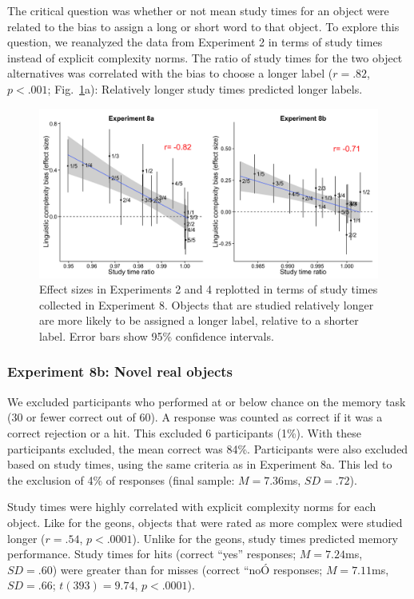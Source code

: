 \documentclass[man]{apa2}
\begin{document}
The critical question was whether or not mean study times for an object were related to the bias to assign a long or short word to that object. To explore this question, we reanalyzed the data from Experiment 2 in terms of study times instead of explicit complexity norms. The ratio of study times for the two object alternatives was correlated with the bias to choose a longer label ($r = .82$, $p < .001$; Fig.\ \ref{fig:study3_plots}a): Relatively longer study times predicted longer labels. 

 \begin{figure} 
 \begin{center} 
  \includegraphics[width=6in]{figures/study3_plots.png} 
  \caption{\label{fig:study3_plots} Effect sizes in Experiments 2 and 4 replotted in terms of study times collected in Experiment 8. Objects that are studied relatively longer are more likely to be assigned a longer label, relative to a shorter label. Error bars show 95\% confidence intervals.} 
 \end{center} 
\end{figure}	

\subsubsection{Experiment 8b: Novel real objects} 
We excluded participants who performed at or below chance on the memory task (30 or fewer correct out of 60). A response was counted as correct if it was a correct rejection or a hit. This excluded 6 participants (1\%). With these participants excluded, the mean correct was 84\%. Participants were also excluded based on study times, using the same criteria as in Experiment 8a. This led to the exclusion of 4\% of responses (final sample: $M = 7.36$ms, $SD = .72$). 

Study times were highly correlated with explicit complexity norms for each object. Like for the geons, objects that were rated as more complex were studied longer ($r = .54$, $p < .0001$). Unlike for the geons, study times predicted memory performance. Study times for hits (correct ``yes'' responses; $M = 7.24$ms, $SD = .60$) were greater than for misses (correct ``noÓ responses; $M = 7.11$ms, $SD = .66$; $t(393) = 9.74$, $p<.0001$).
\end{document}
